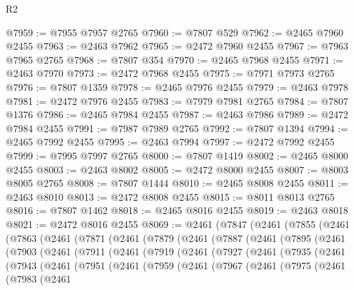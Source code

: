 \begin{lexlean}{R2}
\begin{coremodule}
@7959 := @7955 @7957 @2765
@7960 := @7807 @529
@7962 := @2465 @7960 @2455
@7963 := @2463 @7962
@7965 := @2472 @7960 @2455
@7967 := @7963 @7965 @2765
@7968 := @7807 @354
@7970 := @2465 @7968 @2455
@7971 := @2463 @7970
@7973 := @2472 @7968 @2455
@7975 := @7971 @7973 @2765
@7976 := @7807 @1359
@7978 := @2465 @7976 @2455
@7979 := @2463 @7978
@7981 := @2472 @7976 @2455
@7983 := @7979 @7981 @2765
@7984 := @7807 @1376
@7986 := @2465 @7984 @2455
@7987 := @2463 @7986
@7989 := @2472 @7984 @2455
@7991 := @7987 @7989 @2765
@7992 := @7807 @1394
@7994 := @2465 @7992 @2455
@7995 := @2463 @7994
@7997 := @2472 @7992 @2455
@7999 := @7995 @7997 @2765
@8000 := @7807 @1419
@8002 := @2465 @8000 @2455
@8003 := @2463 @8002
@8005 := @2472 @8000 @2455
@8007 := @8003 @8005 @2765
@8008 := @7807 @1444
@8010 := @2465 @8008 @2455
@8011 := @2463 @8010
@8013 := @2472 @8008 @2455
@8015 := @8011 @8013 @2765
@8016 := @7807 @1462
@8018 := @2465 @8016 @2455
@8019 := @2463 @8018
@8021 := @2472 @8016 @2455
@8069 := @2461
    (@7847
      (@2461
        (@7855
          (@2461
            (@7863
              (@2461
                (@7871
                  (@2461
                    (@7879
                      (@2461
                        (@7887
                          (@2461
                            (@7895
                              (@2461
                                (@7903
                                  (@2461
                                    (@7911
                                      (@2461
                                        (@7919
                                          (@2461
                                            (@7927
                                              (@2461
                                                (@7935
                                                  (@2461
                                                    (@7943
                                                      (@2461
                                                        (@7951
                                                          (@2461
                                                            (@7959
                                                              (@2461
                                                                (@7967
                                                                  (@2461
                                                                    (@7975
                                                                      (@2461
                                                                        (@7983
                                                                          (@2461

\end{coremodule}
\end{lexlean}
